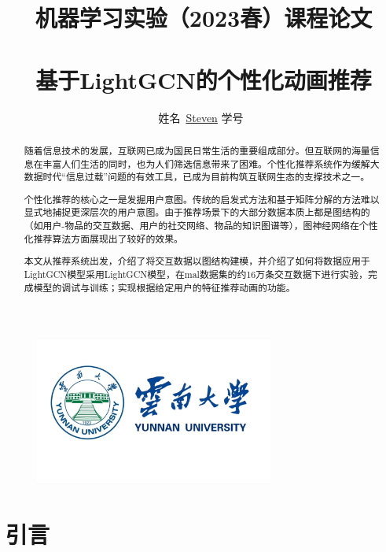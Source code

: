 \documentclass[hyperref,a4paper,UTF8]{ctexart}
\title{
机器学习实验（2023春）课程论文\\
~\\
\textbf{基于LightGCN的个性化动画推荐}
}
\author{
\kaishu\normalsize
姓名\ \underline{Steven} \qquad
学号\ \underline{} \qquad
}
\date{} %
\begin{document}
\begin{figure}
    \centering
    \includegraphics[width=0.7\textwidth]{fig/ynu.jpg}
\end{figure}
\maketitle



\begin{abstract}
    随着信息技术的发展，互联网已成为国民日常生活的重要组成部分。但互联网的海量信息在丰富人们生活的同时，也为人们筛选信息带来了困难。个性化推荐系统作为缓解大数据时代“信息过载”问题的有效工具，已成为目前构筑互联网生态的支撑技术之一。

    个性化推荐的核心之一是发掘用户意图。传统的启发式方法和基于矩阵分解的方法难以显式地捕捉更深层次的用户意图。由于推荐场景下的大部分数据本质上都是图结构的（如用户-物品的交互数据、用户的社交网络、物品的知识图谱等），图神经网络在个性化推荐算法方面展现出了较好的效果。

    本文从推荐系统出发，介绍了将交互数据以图结构建模，并介绍了如何将数据应用于LightGCN模型采用LightGCN模型，在mal数据集的约16万条交互数据下进行实验，完成模型的调试与训练；实现根据给定用户的特征推荐动画的功能。

\end{abstract}
\thispagestyle{empty} %

\newpage %
\tableofcontents %
\thispagestyle{empty} %

\newpage %
\listoffigures %

\listoftables %

\thispagestyle{empty} %

\newpage
\section{引言}
\end{document}
